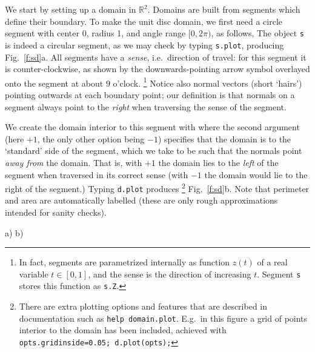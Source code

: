 \documentclass[11pt]{article}
\begin{document}
We start by setting up a domain in $\mathbb{R}^2$.
Domains are built from segments which define their boundary.
To make the unit disc domain,
we first need a circle segment with center
0, radius 1, and angle range
$[0,2\pi)$, as follows,
The object {\tt s} is indeed a circular segment, as we may check by
typing {\tt s.plot}, producing Fig.~\ref{f:sd}a.
All segments have a {\em sense}, i.e.\ direction of travel:
for this segment it is counter-clockwise, as shown by the
downwards-pointing
arrow symbol overlayed onto the segment at about 9 o'clock.%
  \footnote{In fact, segments are parametrized internally as function $z(t)$
    of a real variable $t\in[0,1]$, and the sense is the direction of
    increasing $t$. Segment {\tt s} stores this function as {\tt s.Z}.}
Notice also normal vectors (short `hairs') pointing outwards
at each boundary point; our definition is that
normals on a segment always point to the {\em right} when traversing the
sense of the segment.

We create the domain interior to this segment with
where the second argument (here $+1$, the only other option being $-1$)
specifies that the domain is to the `standard' side of the segment, which
we take to be such that the normals point {\em away from} the domain.
That is, with $+1$ the domain lies to the {\em left} of the segment
when traversed in its correct sense (with $-1$ the domain
would lie to the right of the segment.)
Typing {\tt d.plot} produces%
  \footnote{There are extra plotting options and features that
    are described in documentation such as {\tt help domain.plot}.
    E.g.\ in this figure a grid of points interior to the domain has been
    included, achieved with {\tt opts.gridinside=0.05; d.plot(opts);}
  }
Fig.~\ref{f:sd}b.
Note that perimeter and area are automatically
labelled (these are only rough approximations intended for sanity checks).

\bfi %
a)
b)
\efi
\end{document}
